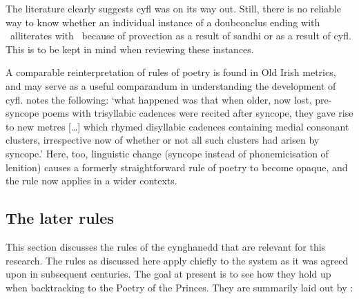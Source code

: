 The literature clearly suggests \gls{cyfl} was on its way out. Still, there is no reliable way to know whether an individual instance of a \gls{doubconclus} ending with \lT\ alliterates with \xT\ because of provection as a result of sandhi or as a result of \gls{cyfl}. This is to be kept in mind when reviewing these instances.

A comparable reinterpretation of rules of poetry is found in Old Irish metrics, and may serve as a useful comparandum in understanding the development of \gls{cyfl}. \textcite[173]{sims-williams_dating_2016} notes the following: `what happened was that when older, now lost, pre-syncope poems with trisyllabic cadences were recited after syncope, they gave rise to new metres [\dots] which rhymed disyllabic cadences containing medial consonant clusters, irrespective now of whether or not all such clusters had arisen by syncope.' Here, too, linguistic change (syncope instead of phonemicisation of lenition) causes a formerly straightforward rule of poetry to become opaque, and the rule now applies in a wider contexts.




\subsection{The later rules}
\label{rules}
This section discusses the rules of the cynghanedd that are relevant for this research. The rules as discussed here apply chiefly to the system as it was agreed upon in subsequent centuries. The goal at present is to see how they hold up when backtracking to the Poetry of the Princes.
They are summarily laid out by \textcite{roberts_anghenion_1973}:




